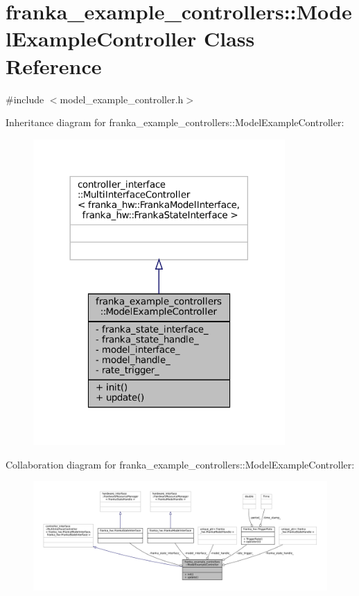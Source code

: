 \hypertarget{classfranka__example__controllers_1_1ModelExampleController}{}\section{franka\+\_\+example\+\_\+controllers\+:\+:Model\+Example\+Controller Class Reference}
\label{classfranka__example__controllers_1_1ModelExampleController}


{\ttfamily \#include $<$model\+\_\+example\+\_\+controller.\+h$>$}



Inheritance diagram for franka\+\_\+example\+\_\+controllers\+:\+:Model\+Example\+Controller\+:
\nopagebreak
\begin{figure}[H]
\begin{center}
\leavevmode
\includegraphics[width=272pt]{classfranka__example__controllers_1_1ModelExampleController__inherit__graph}
\end{center}
\end{figure}


Collaboration diagram for franka\+\_\+example\+\_\+controllers\+:\+:Model\+Example\+Controller\+:
\nopagebreak
\begin{figure}[H]
\begin{center}
\leavevmode
\includegraphics[width=350pt]{classfranka__example__controllers_1_1ModelExampleController__coll__graph}
\end{center}
\end{figure}
